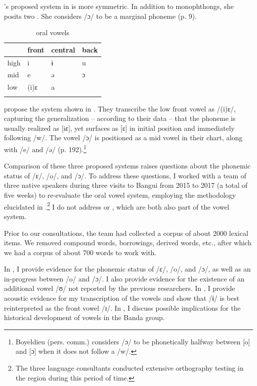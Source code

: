 \documentclass[output=paper,colorlinks,citecolor=brown]{langscibook}
\begin{document}
\citeauthor{Théret-Kieschke1998}’s proposed system in  is more  symmetric. In addition to monophthongs, she posits two . She considers /ɔ/ to be a marginal phoneme  (p. 9).

\begin{table}
\caption{ oral vowels \citep[191]{BoyeldieuCloarec-Heiss2001}}
\label{tab:olson:3}
    \begin{tabular}{llll}
    \lsptoprule
                & front & central & back\\
    \midrule
    high        & i     & ɨ       & u\\
    mid         & e     & ə       & ɔ\\
    low         & (i)ɛ  & a       &\\
    \lspbottomrule
    \end{tabular}
\end{table}

\citeauthor{BoyeldieuCloarec-Heiss2001} propose the system shown in . They transcribe the low front vowel as /(i)ɛ/, capturing the generalization -- according to their data -- that the phoneme is usually realized as [iɛ], yet surfaces as [ɛ] in initial position and immediately following /w/. The vowel /ɔ/ is positioned as a mid vowel in their chart, along with /e/ and /ə/ (p. 192).\footnote{Boyeldieu (pers. comm.) considers /ɔ/ to be phonetically halfway between [o] and [ɔ] when it does not follow a /w/.}

Comparison of these three proposed systems  raises questions about the phonemic status of /ɛ/, /o/, and /ɔ/. To address these questions, I worked with a team of three native  speakers during three visits to Bangui from 2015 to 2017 (a total of five weeks) to re-evaluate the oral vowel system, employing the  methodology elucidated in \citet{Kutsch-Lojenga1996}.\footnote{The three language consultants conducted extensive orthography testing in the  region during this period of time.}  I do not address  or , which are both also part of the   vowel system.

Prior to our consultations, the team had collected a corpus of about 2000 lexical items. We removed compound words, borrowings, derived words, etc., after which we had a corpus of about 700 words to work with.

In , I provide evidence for the phonemic status of /ɛ/, /o/, and /ɔ/, as well as an in-progress  between /o/ and /ɔ/. I also provide evidence for the existence of an additional vowel /ʊ/ not reported by the previous researchers. In , I provide acoustic evidence for my transcription of the vowels and show that /ɨ/ is best reinterpreted as the front vowel /ɪ/. In , I discuss possible implications for the historical development of vowels in the Banda  group.
\end{document}

